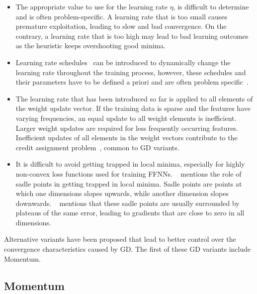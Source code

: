 \begin{itemize}
      \item The appropriate value to use for the learning rate $\eta$, is difficult to determine and is often problem-specific. A learning rate that is too small causes premature exploitation, leading to slow and bad convergence. On the contrary, a learning rate that is too high may lead to bad learning outcomes as the heuristic keeps overshooting good minima.

      \item Learning rate schedules~\cite{ref:robbins:1951} can be introduced to dynamically change the learning rate throughout the training process, however, these schedules and their parameters have to be defined a priori and are often problem specific~\cite{ref:darken:1992}.

      \item The learning rate that has been introduced so far is applied to all elements of the weight update vector. If the training data is sparse and the features have varying frequencies, an equal update to all weight elements is inefficient. Larger weight updates are required for less frequently occurring features. Inefficient updates of all elements in the weight vectors contribute to the credit assignment problem~\cite{ref:rumelhart:1986}, common to \acs{GD} variants.

      \item It is difficult to avoid getting trapped in local minima, especially for highly non-convex loss functions used for training \acp{FFNN}. \citeauthor{ref:dauphin:2014}~\cite{ref:dauphin:2014} mentions the role of sadle points in getting trapped in local minima. Sadle points are points at which one dimensions slopes upwards, while another dimension slopes downwards. \citeauthor{ref:ruder:2016}~\cite{ref:ruder:2016} mentions that these sadle points are usually surrounded by plateaus of the same error, leading to gradients that are close to zero in all dimensions.
\end{itemize}

Alternative variants have been proposed that lead to better control over the convergence characteristics caused by \acs{GD}. The first of these \acs{GD} variants include \acs{Momentum}.

\subsection{Momentum}\label{sec:heuristics:gd:momentum}


